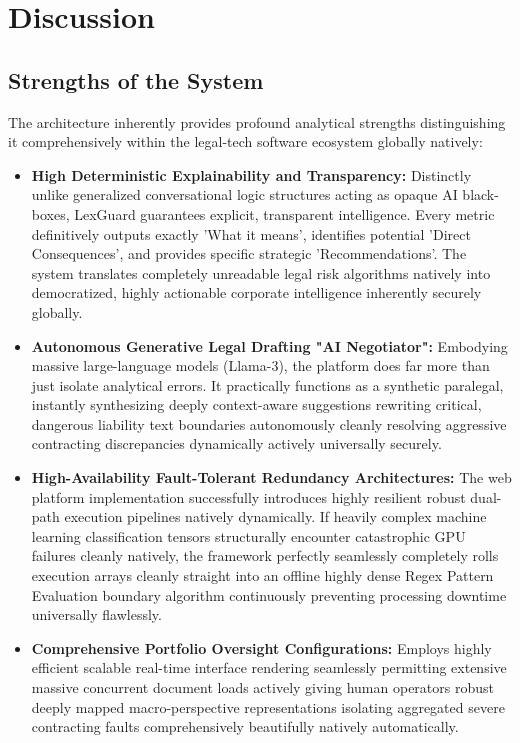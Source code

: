 \documentclass[a4paper,12pt]{report}
\begin{document}
\section{Discussion}

\subsection{Strengths of the System}

The architecture inherently provides profound analytical strengths distinguishing it comprehensively within the legal-tech software ecosystem globally natively:

\begin{itemize}
    \item \textbf{High Deterministic Explainability and Transparency:} Distinctly unlike generalized conversational logic structures acting as opaque AI black-boxes, LexGuard guarantees explicit, transparent intelligence. Every metric definitively outputs exactly 'What it means', identifies potential 'Direct Consequences', and provides specific strategic 'Recommendations'. The system translates completely unreadable legal risk algorithms natively into democratized, highly actionable corporate intelligence inherently securely globally.

    \item \textbf{Autonomous Generative Legal Drafting "AI Negotiator":} Embodying massive large-language models (Llama-3), the platform does far more than just isolate analytical errors. It practically functions as a synthetic paralegal, instantly synthesizing deeply context-aware suggestions rewriting critical, dangerous liability text boundaries autonomously cleanly resolving aggressive contracting discrepancies dynamically actively universally securely.

    \item \textbf{High-Availability Fault-Tolerant Redundancy Architectures:} The web platform implementation successfully introduces highly resilient robust dual-path execution pipelines natively dynamically. If heavily complex machine learning classification tensors structurally encounter catastrophic GPU failures cleanly natively, the framework perfectly seamlessly completely rolls execution arrays cleanly straight into an offline highly dense Regex Pattern Evaluation boundary algorithm continuously preventing processing downtime universally flawlessly.
    
    \item \textbf{Comprehensive Portfolio Oversight Configurations:} Employs highly efficient scalable real-time interface rendering seamlessly permitting extensive massive concurrent document loads actively giving human operators robust deeply mapped macro-perspective representations isolating aggregated severe contracting faults comprehensively beautifully natively automatically.
\end{itemize}
\end{document}
